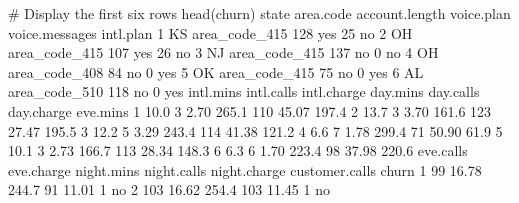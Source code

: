 \documentclass[
  11pt,
]{book}
\makeatletter
\newenvironment{Shaded}{}{}
\newcommand{\CommentTok}[1]{\textcolor[rgb]{0.36,0.36,0.36}{#1}}
\newcommand{\DecValTok}[1]{#1}
\newcommand{\FloatTok}[1]{#1}
\newcommand{\FunctionTok}[1]{#1}
\newcommand{\NormalTok}[1]{#1}
\newenvironment{kframe}{%
\medskip{}
\setlength{\fboxsep}{.8em}
 \def\at@end@of@kframe{}%
 \ifinner\ifhmode%
  \def\at@end@of@kframe{\end{minipage}}%
  \begin{minipage}{\columnwidth}%
 \fi\fi%
 \def\FrameCommand##1{\hskip\@totalleftmargin \hskip-\fboxsep
 \colorbox{shadecolor}{##1}\hskip-\fboxsep
     \hskip-\linewidth \hskip-\@totalleftmargin \hskip\columnwidth}%
 \MakeFramed {\advance\hsize-\width
   \@totalleftmargin\z@ \linewidth\hsize
   \@setminipage}}%
 {\par\unskip\endMakeFramed%
 \at@end@of@kframe}
\renewenvironment{Shaded}{\begin{kframe}}{\end{kframe}}
\theoremstyle{definition}
\theoremstyle{definition}
\theoremstyle{definition}
\theoremstyle{definition}
\theoremstyle{remark}
\makeatother
\begin{document}
\begin{Shaded}
\begin{Highlighting}[]
\CommentTok{\# Display the first six rows}
\FunctionTok{head}\NormalTok{(churn)}
\NormalTok{     state     area.code account.length voice.plan voice.messages intl.plan}
   \DecValTok{1}\NormalTok{    KS area\_code\_415            }\DecValTok{128}\NormalTok{        yes             }\DecValTok{25}\NormalTok{        no}
   \DecValTok{2}\NormalTok{    OH area\_code\_415            }\DecValTok{107}\NormalTok{        yes             }\DecValTok{26}\NormalTok{        no}
   \DecValTok{3}\NormalTok{    NJ area\_code\_415            }\DecValTok{137}\NormalTok{         no              }\DecValTok{0}\NormalTok{        no}
   \DecValTok{4}\NormalTok{    OH area\_code\_408             }\DecValTok{84}\NormalTok{         no              }\DecValTok{0}\NormalTok{       yes}
   \DecValTok{5}\NormalTok{    OK area\_code\_415             }\DecValTok{75}\NormalTok{         no              }\DecValTok{0}\NormalTok{       yes}
   \DecValTok{6}\NormalTok{    AL area\_code\_510            }\DecValTok{118}\NormalTok{         no              }\DecValTok{0}\NormalTok{       yes}
\NormalTok{     intl.mins intl.calls intl.charge day.mins day.calls day.charge eve.mins}
   \DecValTok{1}      \FloatTok{10.0}          \DecValTok{3}        \FloatTok{2.70}    \FloatTok{265.1}       \DecValTok{110}      \FloatTok{45.07}    \FloatTok{197.4}
   \DecValTok{2}      \FloatTok{13.7}          \DecValTok{3}        \FloatTok{3.70}    \FloatTok{161.6}       \DecValTok{123}      \FloatTok{27.47}    \FloatTok{195.5}
   \DecValTok{3}      \FloatTok{12.2}          \DecValTok{5}        \FloatTok{3.29}    \FloatTok{243.4}       \DecValTok{114}      \FloatTok{41.38}    \FloatTok{121.2}
   \DecValTok{4}       \FloatTok{6.6}          \DecValTok{7}        \FloatTok{1.78}    \FloatTok{299.4}        \DecValTok{71}      \FloatTok{50.90}     \FloatTok{61.9}
   \DecValTok{5}      \FloatTok{10.1}          \DecValTok{3}        \FloatTok{2.73}    \FloatTok{166.7}       \DecValTok{113}      \FloatTok{28.34}    \FloatTok{148.3}
   \DecValTok{6}       \FloatTok{6.3}          \DecValTok{6}        \FloatTok{1.70}    \FloatTok{223.4}        \DecValTok{98}      \FloatTok{37.98}    \FloatTok{220.6}
\NormalTok{     eve.calls eve.charge night.mins night.calls night.charge customer.calls churn}
   \DecValTok{1}        \DecValTok{99}      \FloatTok{16.78}      \FloatTok{244.7}          \DecValTok{91}        \FloatTok{11.01}              \DecValTok{1}\NormalTok{    no}
   \DecValTok{2}       \DecValTok{103}      \FloatTok{16.62}      \FloatTok{254.4}         \DecValTok{103}        \FloatTok{11.45}              \DecValTok{1}\NormalTok{    no}

\end{Highlighting}
\end{Shaded}
\end{document}
